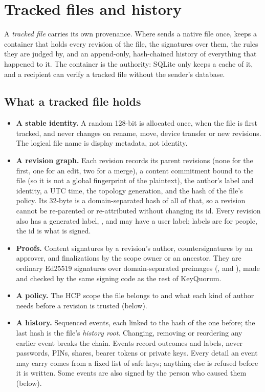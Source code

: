 \section{Tracked files and history}
\label{sec:file-history}

A \emph{tracked file} carries its own provenance. Where 
sends a native file once,  keeps a 
container that holds every revision of the file, the signatures over them,
the rules they are judged by, and an append-only, hash-chained history of
everything that happened to it. The container is the authority: SQLite only
keeps a cache of it, and a recipient can verify a tracked file without the
sender's database.

\subsection{What a tracked file holds}

\begin{itemize}
  \item \textbf{A stable identity.} A random 128-bit  is
  allocated once, when the file is first tracked, and never changes on
  rename, move, device transfer or new revisions. The logical file name is
  display metadata, not identity.
  \item \textbf{A revision graph.} Each revision records its parent
  revisions (none for the first, one for an edit, two for a merge), a
  content commitment bound to the file (so it is not a global fingerprint
  of the plaintext), the author's label and identity, a UTC time, the
  topology generation, and the hash of the file's policy. Its 32-byte
   is a domain-separated hash of all of that, so a
  revision cannot be re-parented or re-attributed without changing its id.
  Every revision also has a generated label,
  , and may have a user label;
  labels are for people, the id is what is signed.
  \item \textbf{Proofs.} Content signatures by a revision's author,
  countersignatures by an approver, and finalizations by the scope owner or
  an ancestor. They are ordinary Ed25519 signatures over domain-separated
  preimages (,  and
  ), made and checked by the same signing code as the
  rest of KeyQuorum.
  \item \textbf{A policy.} The HCP scope the file belongs to and what each
  kind of author needs before a revision is trusted (below).
  \item \textbf{A history.} Sequenced events, each linked to the hash of
  the one before; the last hash is the file's \emph{history root}. Changing,
  removing or reordering any earlier event breaks the chain. Events record
  outcomes and labels, never passwords, PINs, shares, bearer tokens or
  private keys. Every detail an event may carry comes from a fixed list of
  safe keys; anything else is refused before it is written. Some events are
  also signed by the person who caused them (below).
\end{itemize}

